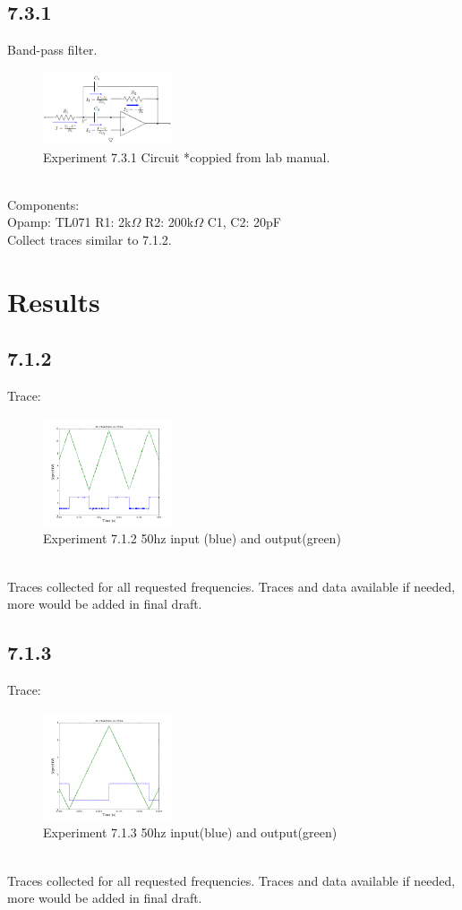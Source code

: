 \documentclass[a4paper,12pt]{article}
\begin{document}
\subsection*{7.3.1}
Band-pass filter.
\begin{figure}[h]
\centering
\includegraphics[width=1.5in]{7.3.1/Circuit_Diagram.png}
\caption{Experiment 7.3.1 Circuit *coppied from lab manual.}
\end{figure}\\
Components:\\
Opamp: TL071 R1: 2k$\Omega$  R2: 200k$\Omega$  C1, C2: 20pF\\
Collect traces similar to 7.1.2.

\section*{Results}

\subsection*{7.1.2}
Trace:
\begin{figure}[h]
\centering
\includegraphics[width=1.5in]{7.1.2/lab7_1_2_50hz_ch1_ch2.png}
\caption{Experiment 7.1.2 50hz input (blue) and output(green)}
\end{figure}\\
Traces collected for all requested frequencies.  Traces and data available if needed, more would be added in final draft.

\subsection*{7.1.3}
Trace:
\begin{figure}[h]
\centering
\includegraphics[width=1.5in]{7.1.3/lab7_1_3_50hz_ch1_ch2.png}
\caption{Experiment 7.1.3 50hz input(blue) and output(green)}
\end{figure}\\
Traces collected for all requested frequencies.  Traces and data available if needed, more would be added in final draft.
\end{document}
